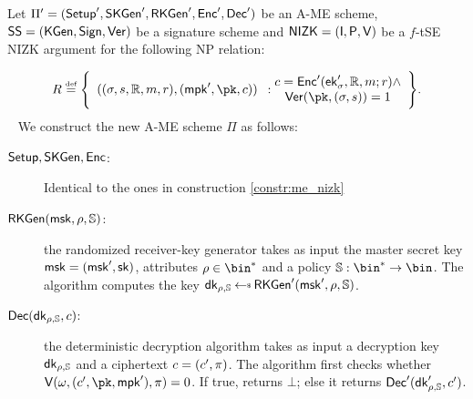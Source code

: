 \begin{construction}\label{constr:ame_nizk}
    Let $\Pi'=(\mathsf{Setup}',\mathsf{SKGen}',\mathsf{RKGen}', \mathsf{Enc}',\mathsf{Dec}')$ be an A-ME scheme, $\mathsf{SS} =(\mathsf{KGen},\mathsf{Sign},\mathsf{Ver})$ be a signature scheme and $\mathsf{NIZK}=(\mathsf{I}, \mathsf{P}, \mathsf{V})$ be a $f$-tSE NIZK argument for the following NP relation:

    \[
        R \eqdef \Biggl\{ \begin{array}{c}((\sattr, \signature, \raccess, \msg, r),(\mpk', \pk, \cipher))\end{array}:\begin{array}{@{}c}
            \cipher = \enc'(\ek'_\sattr, \raccess, \msg; r) \land \\
            \ver(\pk, (\sattr, \signature)) = 1
        \end{array} \Biggr\}.
    \]
    ~\newline\newline
    We construct the new A-ME scheme $\Pi$ as follows:
    \begin{description}
        \item[$\mathsf{Setup}, \mathsf{SKGen},\mathsf{Enc}$:] Identical to the ones in construction \ref{constr:me_nizk}
        \item[$\mathsf{RKGen}(\mathsf{msk}, \rho, \mathbb{S})$:] the randomized receiver-key generator takes as input the master secret key $\mathsf{msk} = (\mathsf{msk}', \mathsf{sk})$, attributes $\rattr \in \bin^*$ and a policy $\saccess:\bin^* \to \bin$. The algorithm computes the key $\dk_{\rattr, \saccess} \getsr \rkgen'(\msk', \rattr, \saccess)$.
        \item[$\mathsf{Dec}(\mathsf{dk}_{\rho, \mathbb{S}}, c)$:] the deterministic decryption algorithm takes as input a decryption key $\mathsf{dk}_{\rho, \mathbb{S}}$ and a ciphertext $c = (c', \pi)$. The algorithm first checks whether $\verifier(\crs, (\cipher', \pk, \mpk'), \pi) = 0$. If true, returns $\bot$; else it returns $\mathsf{Dec}'(\mathsf{dk}'_{\rho, \mathbb{S}}, c')$.
    \end{description}
\end{construction}